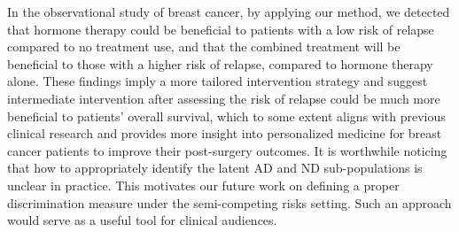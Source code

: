 \documentclass[APA,Times1COL]{WileyNJDv5} %
\theoremstyle{plain}
\begin{document}
In the observational study of breast cancer, by applying our method, we detected that hormone therapy could be beneficial to patients with a low risk of relapse compared to no treatment use, and that the combined treatment will be beneficial to those with a higher risk of relapse, compared to hormone therapy alone. These findings imply a more tailored intervention strategy and suggest intermediate intervention after assessing the risk of relapse could be much more beneficial to patients' overall survival, which to some extent aligns with previous clinical research \citep{sledge2014} and provides more insight into personalized medicine for breast cancer patients to improve their post-surgery outcomes. {It is worthwhile noticing that how to appropriately identify the latent AD and ND sub-populations is unclear in practice. This motivates our future work on defining a proper discrimination measure under the semi-competing risks setting. 
Such an approach would serve as a useful tool for clinical audiences.}


\end{document}
